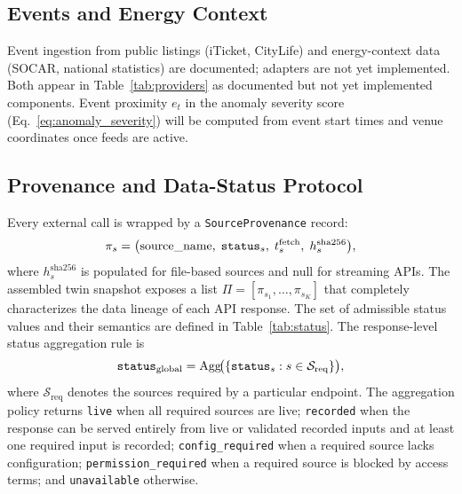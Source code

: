 \subsection{Events and Energy Context}

Event ingestion from public listings (iTicket, CityLife) and energy-context
data (SOCAR, national statistics) are documented; adapters are not yet
implemented.
Both appear in Table~\ref{tab:providers} as documented but not yet
implemented components.
Event proximity $e_t$ in the anomaly severity score
(Eq.~\ref{eq:anomaly_severity}) will be computed from event start times
and venue coordinates once feeds are active.

\subsection{Provenance and Data-Status Protocol}

Every external call is wrapped by a \texttt{SourceProvenance} record:
\begin{equation}
  \pi_s = \bigl(\text{source\_name},\;\mathtt{status}_s,\;t_s^{\text{fetch}},\;
          h_s^{\text{sha256}}\bigr),
  \label{eq:provenance}
\end{equation}
where $h_s^{\text{sha256}}$ is populated for file-based sources and null for
streaming APIs.
The assembled twin snapshot exposes a list
$\Pi = [\pi_{s_1}, \ldots, \pi_{s_K}]$
that completely characterizes the data lineage of each API response.
The set of admissible status values and their semantics are defined in
Table~\ref{tab:status}.
The response-level status aggregation rule is
\begin{equation}
  \mathtt{status}_{\mathrm{global}} =
  \operatorname{Agg}\!\bigl(\{\mathtt{status}_s : s \in \mathcal{S}_{\mathrm{req}}\}\bigr),
  \label{eq:global_status}
\end{equation}
where $\mathcal{S}_{\mathrm{req}}$ denotes the sources required by a
particular endpoint. The aggregation policy returns \texttt{live} when all
required sources are live; \texttt{recorded} when the response can be served
entirely from live or validated recorded inputs and at least one required
input is recorded; \texttt{config\_required} when a required source lacks
configuration; \texttt{permission\_required} when a required source is
blocked by access terms; and \texttt{unavailable} otherwise.

